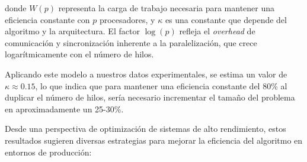         donde $W(p)$ representa la carga de trabajo necesaria para mantener una eficiencia constante con $p$ procesadores, y $\kappa$ es una constante que depende del algoritmo y la arquitectura. El factor $\log(p)$ refleja el \textit{overhead} de comunicación y sincronización inherente a la paralelización, que crece logarítmicamente con el número de hilos.
        
        Aplicando este modelo a nuestros datos experimentales, se estima un valor de $\kappa \approx 0.15$, lo que indica que para mantener una eficiencia constante del 80\% al duplicar el número de hilos, sería necesario incrementar el tamaño del problema en aproximadamente un 25-30\%.
        
        Desde una perspectiva de optimización de sistemas de alto rendimiento, estos resultados sugieren diversas estrategias para mejorar la eficiencia del algoritmo en entornos de producción:
        
